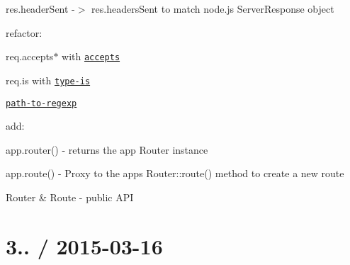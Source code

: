 \begin{DoxyItemize}
\begin{DoxyItemize}
\item {\ttfamily res.\+header\+Sent} -\/$>$ {\ttfamily res.\+headers\+Sent} to match node.\+js Server\+Response object
\end{DoxyItemize}
\item refactor\+:
\begin{DoxyItemize}
\item {\ttfamily req.\+accepts$\ast$} with \href{https://github.com/expressjs/accepts}{\tt accepts}
\item {\ttfamily req.\+is} with \href{https://github.com/expressjs/type-is}{\tt type-\/is}
\item \href{https://github.com/component/path-to-regexp}{\tt path-\/to-\/regexp}
\end{DoxyItemize}
\item add\+:
\begin{DoxyItemize}
\item {\ttfamily app.\+router()} -\/ returns the app Router instance
\item {\ttfamily app.\+route()} -\/ Proxy to the app\textquotesingle{}s {\ttfamily Router\+::route()} method to create a new route
\item Router \& Route -\/ public A\+P\+I
\end{DoxyItemize}
\end{DoxyItemize}

\section*{3.. / 2015-\/03-\/16 }


